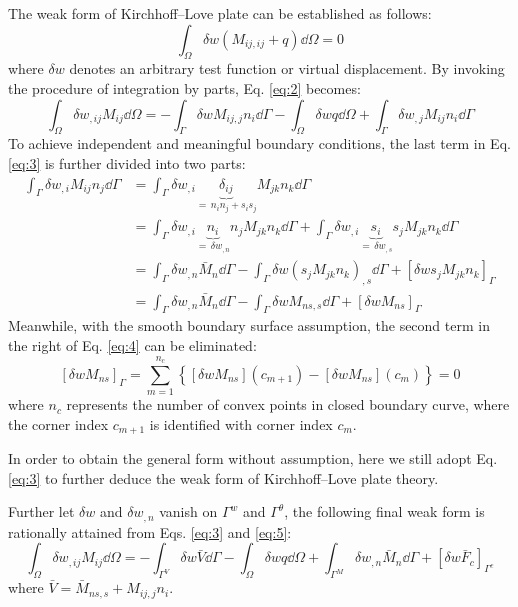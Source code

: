 The weak form of Kirchhoff--Love plate can be established as follows:
\begin{equation}\label{eq:2}
\int_{\Omega}\delta w\left(M_{ij,ij}+q\right)\dd\Omega=0
\end{equation}
where $\delta w$ denotes an arbitrary test function or virtual displacement.
By invoking the procedure of integration by parts, Eq. \eqref{eq:2} becomes:
\begin{equation}\label{eq:3}
\int_{\Omega}\delta w_{,ij}M_{ij}\dd\Omega
=-\int_{\Gamma}\delta wM_{ij,j}n_i\dd\Gamma
-\int_{\Omega}\delta wq\dd\Omega
+\int_{\Gamma}\delta w_{,j}M_{ij}n_i\dd\Gamma
\end{equation}
To achieve independent and meaningful boundary conditions, the last term in Eq. \eqref{eq:3} is further divided into two parts:
\begin{equation}\label{eq:4}
\begin{aligned}
\int_{\Gamma}\delta w_{,i}M_{ij}n_j\dd\Gamma
&=\int_{\Gamma}\delta w_{,i}\underbrace{\delta_{ij}}_{=\,n_in_j+s_is_j}M_{jk}n_k\dd\Gamma\\[2pt]
&=\int_{\Gamma}\delta w_{,i}\underbrace{n_i}_{=\,\delta w_{,n}}n_jM_{jk}n_k\dd\Gamma
+\int_{\Gamma}\delta w_{,i}\underbrace{s_i}_{=\,\delta w_{,s}}s_jM_{jk}n_k\dd\Gamma\\[2pt]
&=\int_{\Gamma}\delta w_{,n}\bar{M}_{n}\dd\Gamma
-\int_{\Gamma}\delta w\left(s_jM_{jk}n_k\right)_{,s}\dd\Gamma
+\left[\delta ws_jM_{jk}n_k\right]_{\Gamma}\\[2pt]
&=\int_{\Gamma}\delta w_{,n}\bar{M}_{n}\dd\Gamma
-\int_{\Gamma}\delta wM_{ns,s}\dd\Gamma
+\left[\delta wM_{ns}\right]_{\Gamma}
\end{aligned}
\end{equation}
Meanwhile, with the smooth boundary surface assumption, the second term in the right of Eq. \eqref{eq:4} can be eliminated:
\begin{equation}\label{eq:5}
\left[\delta wM_{ns}\right]_{\Gamma}
=\sum_{m=1}^{n_{c}}\left\{\left[\delta wM_{ns}\right](c_{m+1})-\left[\delta wM_{ns}\right](c_{m})\right\}=0
\end{equation}
where $n_{c}$ represents the number of convex points in closed boundary curve, where the corner index $c_{m+1}$ is identified with corner index $c_{m}$.

In order to obtain the general form without assumption, here we still adopt Eq. \eqref{eq:3} to further deduce the weak form of Kirchhoff--Love plate theory.

Further let $\delta w$ and $\delta w_{,n}$ vanish on $\Gamma^{w}$ and $\Gamma^{\theta}$, the following final weak form is rationally attained from Eqs. \eqref{eq:3} and \eqref{eq:5}:
\begin{equation}\label{eq:6}
\int_{\Omega}\delta w_{,ij}M_{ij}\dd\Omega
=-\int_{\Gamma^{V}}\delta w\bar{V}\dd\Gamma
-\int_{\Omega}\delta wq\dd\Omega
+\int_{\Gamma^{M}}\delta w_{,n}\bar{M}_{n}\dd\Gamma
+\left[\delta w\bar{F}_{c}\right]_{\Gamma^{c}}
\end{equation}
where $\bar{V}=\bar{M}_{ns,s}+M_{ij,j}n_i$.

